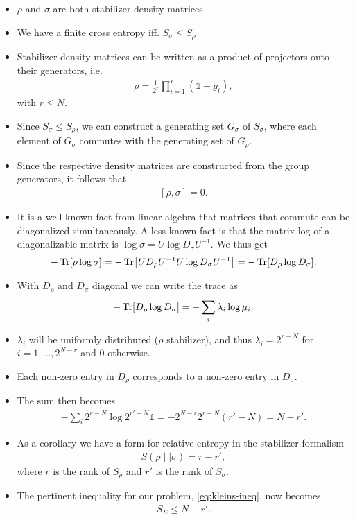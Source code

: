 \begin{itemize}
  \item $\rho$ and $\sigma$ are both stabilizer density matrices
  \item We have a finite cross entropy iff. $S_\sigma \leq S_\rho$
  \item Stabilizer density matrices can be written as a product of projectors
    onto their generators, i.e.
    \begin{align}
    \rho = \frac{1}{2^r}\prod_{i=1}^r \left(\mathds{1} + g_i\right)
    ,\end{align}
    with $r\leq N$.
  \item Since $S_\sigma \leq S_\rho$, we can construct a generating set
    $G_\sigma$ of $S_\sigma$, where each element of $G_\sigma$ commutes with
    the generating set of $G_\rho$.
  \item Since the respective density matrices are constructed from the group
    generators, it follows that
    \begin{align}
      \left[\rho, \sigma\right] = 0
    .\end{align}
  \item It is a well-known fact from linear algebra that matrices that commute
    can be diagonalized simultaneously. A less-known fact is that the matrix
    log of a diagonalizable matrix is $\log\sigma = U \log D_\sigma U^{-1}$. We
    thus get
    \begin{align}
      -\Tr[\rho \log\sigma] = -\Tr[U D_\rho U^{-1} U \log D_\sigma U^{-1}] =
      -\Tr[D_\rho \log D_\sigma] 
    .\end{align}
  \item With $D_\rho$ and $D_\sigma$ diagonal we can write the trace as
    \begin{align}
      -\Tr[D_\rho \log D_\sigma] = -\sum_i \lambda_i \log \mu_i
    .\end{align}
  \item $\lambda_i$ will be uniformly distributed ($\rho$ stabilizer), and thus
    $\lambda_i = 2^{r-N}$ for $i=1,\ldots,2^{N-r}$ and $0$ otherwise.
  \item Each non-zero entry in $D_\rho$ corresponds to a non-zero entry in
    $D_\sigma$. 
  \item The sum then becomes
    \begin{align}
      -\sum_i 2^{r-N} \log 2^{r'-N} \mathds{1} =
      -2^{N-r}2^{r-N}\left(r'-N\right)= N-r'
    .\end{align}
  \item As a corollary we have a form for relative entropy in the stabilizer
    formalism
    \begin{align}
      S(\rho \mid\mid \sigma) = r - r'
    ,\end{align}
    where $r$ is the rank of $S_\rho$ and $r'$ is the rank of $S_\sigma$.
  \item The pertinent inequality for our problem, \cref{eq:kleins-ineq}, now
    becomes
    \begin{align}
      S_E \leq N-r'
    .\end{align}
\end{itemize}

